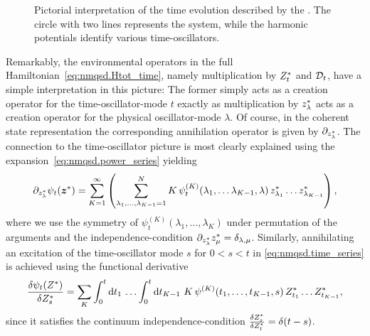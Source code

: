 \begin{figure}[p]
  \caption{%
    Pictorial interpretation of the time evolution described by the {\NMSSE}.
    The circle with two lines represents the system, while the harmonic potentials identify various time-oscillators.
  }
  \label{fig:nmqsd.timeosz}
\end{figure}

Remarkably, the environmental operators in the full Hamiltonian~\ref{eq:nmqsd.Htot_time}, namely multiplication by ${Z}^*_t$ and $\mathcal{D}_t$, have a simple interpretation in this picture:
The former simply acts as a creation operator for the time-oscillator-mode $t$ exactly as multiplication by ${z}^*_\lambda$ acts as a creation operator for the physical oscillator-mode $\lambda$.
Of course, in the coherent state representation the corresponding annihilation operator is given by $\partial_{{z}^*_\lambda}$.
The connection to the time-oscillator picture is most clearly explained using the expansion~\ref{eq:nmqsd.power_series} yielding
\begin{equation*}
  \partial_{{z}^*_\lambda} \psi_t({\boldsymbol{z}}^*) = \sum_{K=1}^\infty \left( \sum_{\lambda_1,\ldots,\lambda_{K-1}=1}^N K\, \psi_t^{(K)}(\lambda_1,\ldots\lambda_{K-1}, \lambda) \, {z}^*_{\lambda_1} \ldots {z}^*_{\lambda_{K-1}} \right),
\end{equation*}
where we use the symmetry of $\psi_t^{(K)}(\lambda_1, \ldots, \lambda_K)$ under permutation of the arguments and the independence-condition $\partial_{{z}^*_\lambda} {z}^*_\mu = \delta_{\lambda, \mu}$.
Similarly, annihilating an excitation of the time-oscillator mode $s$ for $0 < s < t$ in \autoref{eq:nmqsd.time_series} is achieved using the functional derivative
\begin{equation*}
  \frac{\delta \psi_t({Z}^*)}{\delta {Z}^*_s} = \sum_K \int_{0}^{t}\mathrm{d}t_1\, \ldots \int_{0}^{t}\mathrm{d}t_{K-1}\, \, K \, \psi^{(K)}(t_1, \ldots, t_{K-1}, s) \, {Z}^*_{t_1} \ldots {Z}^*_{t_{K-1}},
\end{equation*}
since it satisfies the continuum independence-condition $\frac{\delta {Z}^*_s}{\delta {Z}^*_t} = \delta(t - s)$.

